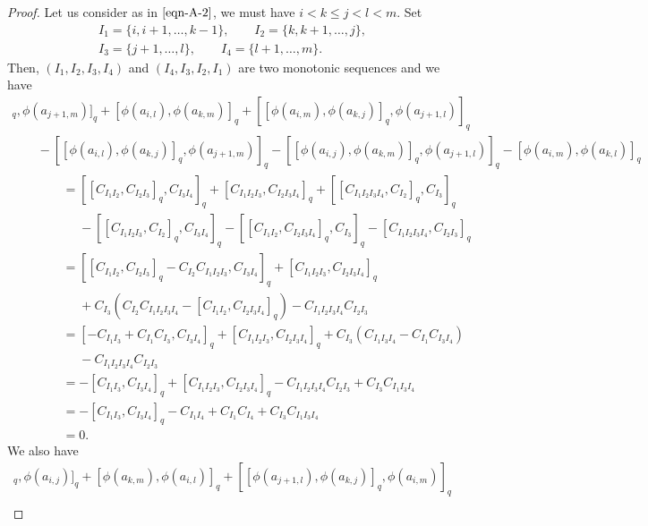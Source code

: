 \documentclass[10pt,a4paper]{amsart}
\numberwithin{equation}{section}
\def\lrb#1{\left(#1\right)}
\def\A{\mathscr{A}}
\begin{document}
\begin{proof}
Let us consider \smash{$\A_{i,k,j+1}^{j,l,m}$} as in $\eqref{eqn-A-2}$, we must have
$ i < k \leq j < l < m $. Set
\begin{gather*}
I_1=\{i, i+1, \dots, k-1\}, \qquad I_2=\{k, k+1, \dots, j\},\\
 I_3=\{ j+1, \dots, l\},\qquad I_4=\{l+1, \dots, m\}.
\end{gather*}
Then, $(I_1, I_2, I_3, I_4)$ and $(I_4, I_3, I_2, I_1)$ are two monotonic sequences and we have
 \begin{gather*}
 [ [\phi(a_{i, j}), \phi(a_{k, l}) ]_q, \phi(a_{j+1, m}) ]_q+ [\phi(a_{i,l}),\phi(a_{k,m}) ]_q+ [ [\phi(a_{i, m}), \phi(a_{k, j}) ]_q, \phi(a_{j+1, l}) ]_q \\
 \qquad - [ [ \phi(a_{i, l }), \phi(a_{k,j}) ]_q, \phi(a_{j+1, m}) ]_q - [ [ \phi(a_{i, j}), \phi(a_{k, m}) ]_q, \phi(a_{j+1, l}) ]_q - [\phi(a_{i, m}), \phi(a_{k, l}) ]_q\\
\phantom{\qquad\qquad}{} = [ [C_{I_1I_2}, C_{I_2I_3} ]_q, C_{I_3I_4} ]_q+ [C_{I_1I_2I_3},C_{I_2I_3I_4} ]_q+ [ [C_{I_1I_2I_3I_4}, C_{I_2} ]_q, C_{I_3} ]_q \\
 \phantom{\qquad\qquad=}{} - [ [ C_{I_1I_2I_3}, C_{I_2} ]_q, C_{I_3I_4} ]_q - [ [ C_{I_1I_2}, C_{I_2I_3I_4} ]_q, C_{I_3} ]_q - [C_{I_1I_2I_3I_4}, C_{I_2I_3} ]_q\\
\phantom{\qquad\qquad}{} = [ [C_{I_1I_2}, C_{I_2I_3} ]_q-C_{I_2}C_{I_1I_2I_3}, C_{I_3I_4} ]_q
+ [C_{I_1I_2I_3},C_{I_2I_3I_4} ]_q \\
 \phantom{\qquad\qquad=}{} + C_{I_3} \lrb{ C_{I_2} C_{I_1I_2I_3I_4}- [ C_{I_1I_2}, C_{I_2I_3I_4} ]_q }- C_{I_1I_2I_3I_4} C_{I_2I_3}\\
 \phantom{\qquad\qquad}{} = [-C_{I_1I_3}+C_{I_1}C_{I_3},C_{I_3I_4} ]_q + [C_{I_1I_2I_3},C_{I_2I_3I_4} ]_q + C_{I_3} \lrb{C_{I_1I_3I_4} -C_{I_1} C_{I_3I_4} }\\
 \phantom{\qquad\qquad=}{}- C_{I_1I_2I_3I_4} C_{I_2I_3}\\
 \phantom{\qquad\qquad}{} = - [C_{I_1I_3},C_{I_3I_4} ]_q + [C_{I_1I_2I_3},C_{I_2I_3I_4} ]_q- C_{I_1I_2I_3I_4} C_{I_2I_3} + C_{I_3} C_{I_1I_3I_4} \\
 \phantom{\qquad\qquad}{} = - [C_{I_1I_3},C_{I_3I_4} ]_q -C_{I_1I_4}+C_{I_1} C_{I_4} + C_{I_3} C_{I_1I_3I_4}\\
 \phantom{\qquad\qquad}{} = 0.
\end{gather*}
We also have
 \begin{gather*}
 [ [\phi(a_{j+1, m}), \phi(a_{k, l}) ]_q, \phi(a_{i, j}) ]_q+ [\phi(a_{k,m}), \phi(a_{i,l}) ]_q + [ [\phi(a_{j+1, l}), \phi(a_{k, j}) ]_q, \phi(a_{i, m}) ]_q \\

\end{gather*}
\end{proof}
\end{document}
